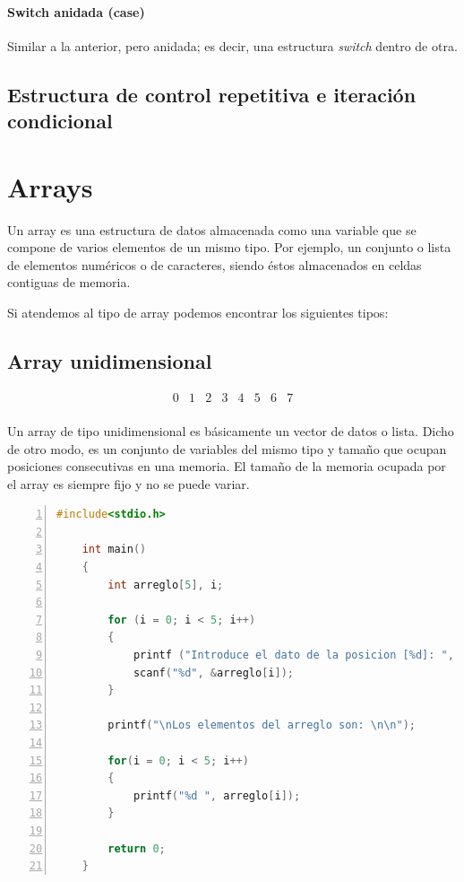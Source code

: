 \documentclass[a4paper, 11pt, titlepage]{article}
\begin{document}
            \paragraph{Switch anidada (case)} Similar a la anterior, pero anidada; es decir,
            una estructura \textit{switch} dentro de otra.

    \subsection{Estructura de control repetitiva e iteración condicional}


\section{Arrays}

    Un array es una estructura de datos almacenada como una variable que se compone 
    de varios elementos de un mismo tipo. Por ejemplo, un conjunto o lista de elementos 
    numéricos o de caracteres, siendo éstos almacenados en celdas contiguas de memoria.

    Si atendemos al tipo de array podemos encontrar los siguientes tipos:

        \subsection{Array unidimensional}

            \begin{equation}
                \begin{matrix} 
                0 & 1 & 2 & 3 & 4 & 5 & 6 & 7 \\
                \end{matrix} 
            \end{equation}

            Un array de tipo unidimensional es básicamente un vector de datos o 
            lista. Dicho de otro modo, es un conjunto de variables del mismo tipo 
            y tamaño que ocupan posiciones consecutivas en una memoria. El tamaño 
            de la memoria ocupada por el array es siempre fijo y no se puede variar.

    \begin{lstlisting}[language=C,numbers=left]
    #include<stdio.h>

    int main()
    {
        int arreglo[5], i;
        
        for (i = 0; i < 5; i++)
        {
            printf ("Introduce el dato de la posicion [%d]: ", i);
            scanf("%d", &arreglo[i]);
        } 
        
        printf("\nLos elementos del arreglo son: \n\n");
        
        for(i = 0; i < 5; i++)
        {
            printf("%d ", arreglo[i]);
        }
        
        return 0;
    }\end{lstlisting} 
            
\end{document}
